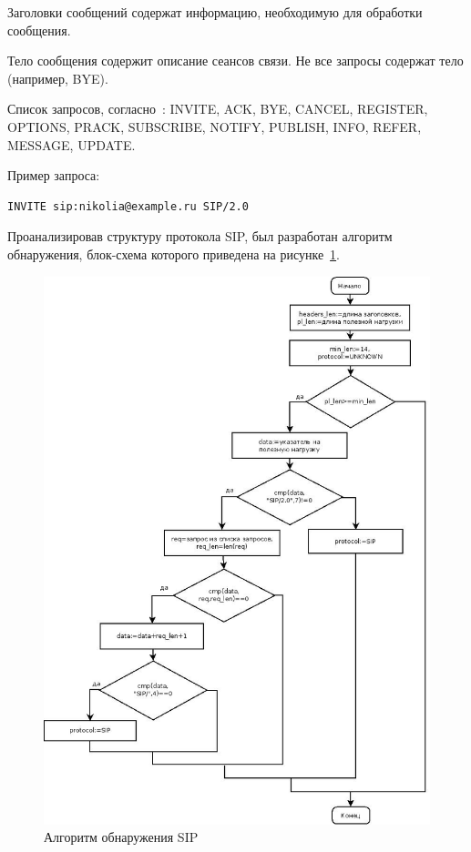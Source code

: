 Заголовки сообщений содержат информацию, необходимую для обработки сообщения.

Тело сообщения содержит описание сеансов связи. Не все запросы содержат тело (например, BYE).

Список запросов, согласно~\cite{sip_rfc}: INVITE, ACK, BYE, CANCEL, REGISTER, OPTIONS, PRACK, SUBSCRIBE, NOTIFY, PUBLISH, INFO, REFER, MESSAGE, UPDATE.

Пример запроса:
\begin{lstlisting}
INVITE sip:nikolia@example.ru SIP/2.0
\end{lstlisting}

Проанализировав структуру протокола SIP, был разработан алгоритм обнаружения, блок-схема которого приведена на рисунке~\ref{pic:sip_alg}.
\begin{figure}
\centering
\includegraphics[scale=0.45]{pictures/sip_alg}
\caption{Алгоритм обнаружения SIP}
\label{pic:sip_alg}
\end{figure}

